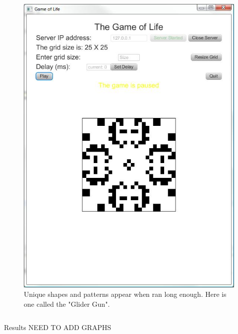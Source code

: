 \documentclass[final]{beamer}
\newlength{\onecolwid}
\newlength{\twocolwid}
\begin{document}
\begin{frame}[t]
\begin{columns}[t]
\begin{column}{\twocolwid}
\begin{columns}[t,totalwidth=\twocolwid]
\begin{column}{\onecolwid}\vspace{-.6in} %
\begin{block}{}
\begin{figure}
\includegraphics[width=.7\linewidth]{gol2.jpg}
\centering \caption{Unique shapes and patterns appear when ran long enough. Here is one called the "Glider Gun".}
\end{figure}
\end{block}

\end{column} %

\end{columns} %

\begin{columns}[t,totalwidth=\twocolwid] %

\begin{column}{\twocolwid} %


\begin{block}{Results}
NEED TO ADD GRAPHS
\end{block}


\end{column}
\end{columns}
\end{column}
\end{columns}
\end{frame}
\end{document}
